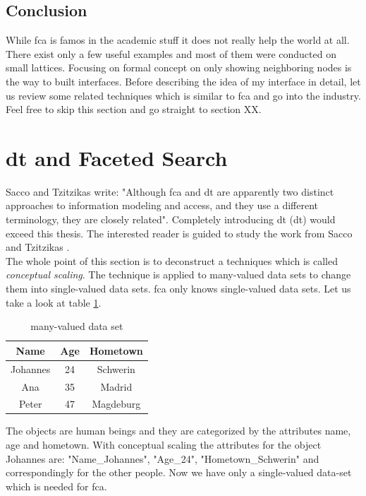 \documentclass[11pt]{report}
\begin{document}
{{\subsection{Conclusion}

While \acrshort{fca} is famos in the academic stuff it does not really help the world at all. There exist only a few useful examples and most of them were conducted on small lattices. Focusing on formal concept on only showing neighboring nodes is the way to built interfaces. Before describing the idea of my interface in detail, let us review some related techniques which is similar to \acrshort{fca} and go into the industry. Feel free to skip this section and go straight to section XX.

\section{\acrlong{dt} and Faceted Search}
\label{dyafs}

Sacco and Tzitzikas \cite{Sacco2009} write: "Although \acrshort{fca} and \acrlong{dt} are apparently two distinct approaches to information modeling and access, and they use a different terminology, they are closely related". Completely introducing  \acrlong{dt} (\acrshort{dt}) would exceed this thesis. The interested reader is guided to study the work from Sacco and Tzitzikas \cite{Sacco2009}. \\

 The whole point of this section is to deconstruct a techniques which is called \textit{conceptual scaling}\cite{carpineto2004concept}. The technique is applied to many-valued data sets to change them into single-valued data sets. \acrshort{fca} only knows single-valued data sets. Let us take a look at table \ref{table:manyvalued}. \\

\begin{table}[h]
\caption{many-valued data set}
\label{table:manyvalued}
\centering

\def\arraystretch{1.2}%
\begin{tabular}{ c c c }
\hline
 Name & Age & Hometown \\
\hline
Johannes & 24 & Schwerin \\
Ana & 35 & Madrid \\
Peter & 47 & Magdeburg \\
\hline
\end{tabular}
\end{table}

The objects are human beings and they are categorized by the attributes name, age and hometown. With conceptual scaling  the attributes for the object Johannes are: "Name\_Johannes", "Age\_24", "Hometown\_Schwerin" and correspondingly for the other people. Now we have only a single-valued data-set which is needed for \acrshort{fca}. \\

}}
\end{document}

